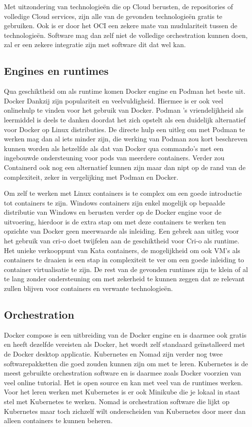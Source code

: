 Met uitzondering van technologieën die op Cloud berusten, de repositories of volledige Cloud services, zijn alle van de gevonden technologieën gratis te gebruiken. Ook is er door het OCI een zekere mate van mudulariteit tussen de technologieën. Software mag dan zelf niet de volledige orchestration kunnen doen, zal er een zekere integratie zijn met software dit dat wel kan.

\subsection{Engines en runtimes}
Qua geschiktheid om als runtime komen Docker engine en Podman het beste uit. Docker Dankzij zijn populariteit en veelvuldigheid. Hiermee is er ook veel onlinehulp te vinden voor het gebruik van Docker. Podman ’s vriendelijkheid als leermiddel is deels te danken doordat het zich opstelt als een duidelijk alternatief voor Docker op Linux distributies. De directe hulp een uitleg om met Podman te werken mag dan al iets minder zijn, die werking van Podman zou kort beschreven kunnen worden als hetzelfde als dat van Docker qua commando’s met een ingebouwde ondersteuning voor pods van meerdere containers.  Verder zou Containerd ook nog een alternatief kunnen zijn maar dan nipt op de rand van de complexiteit, zeker in vergelijking met Podman en Docker.

Om zelf te werken met Linux containers is te complex om een goede introductie tot containers te zijn. Windows containers zijn enkel mogelijk op bepaalde distributie van Windows en berusten verder op de Docker engine voor de uitvoering, hierdoor is de extra stap om met deze containers te werken ten opzichte van Docker geen meerwaarde als inleiding. Een gebrek aan uitleg voor het gebruik van cri-o doet twijfelen aan de geschiktheid voor Cri-o als runtime.  Het unieke verkooppunt van Kata containers, de mogelijkheid om ook VM’s als containers te draaien is een stap in complexiteit te ver om een goede inleiding to container virtualisatie te zijn.  De rest van de gevonden runtimes zijn te klein of al te lang zonder ondersteuning om met zekerheid te kunnen zeggen dat ze relevant zullen blijven voor containers en verwante technologieën.

\subsection{Orchestration}
Docker compose is een uitbreiding van de Docker engine en is daarmee ook gratis en heeft dezelfde vereisten als Docker, het wordt zelf standaard geïnstalleerd met de Docker desktop applicatie. Kubernetes en Nomad zijn verder nog twee softwarepakketten die goed zouden kunnen zijn om met te leren. Kubernetes is de meest gebruikte orchestration software en is daarmee zoals Docker voorzien van veel online tutorial. Het is open source en kan met veel van de runtimes werken. Voor het leren werken met Kubernetes is er ook Minikube die je lokaal in staat stel met Kubernetes te werken. Nomad is orchestration software die lijkt op Kubernetes maar toch zichzelf wilt onderscheiden van Kubernetes door meer dan alleen containers te kunnen beheren. 

